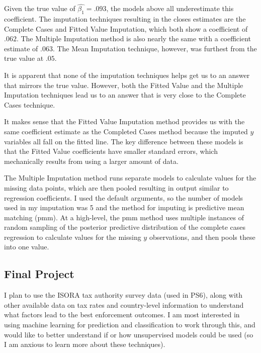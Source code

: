 \documentclass[nobib]{MSword}
\begin{document}
Given the true value of $\hat{\beta_1}=.093$, the models above all underestimate this coefficient. The imputation techniques resulting in the closes estimates are the Complete Cases and Fitted Value Imputation, which both show a coefficient of $.062$. The Multiple Imputation method is also nearly the same with a coefficient estimate of $.063$. The Mean Imputation technique, however, was furthest from the true value at $.05$. 

It is apparent that none of the imputation techniques helps get us to an answer that mirrors the true value. However, both the Fitted Value and the Multiple Imputation techniques lead us to an answer that is very close to the Complete Cases technique.

It makes sense that the Fitted Value Imputation method provides us with the same coefficient estimate as the Completed Cases method because the imputed $y$ variables all fall on the fitted line. The key difference between these models is that the Fitted Value coefficients have smaller standard errors, which mechanically results from using a larger amount of data.

The Multiple Imputation method runs separate models to calculate values for the missing data points, which are then pooled resulting in output similar to regression coefficients. I used the default arguments, so the number of models used in my imputation was 5 and the method for imputing is predictive mean matching (pmm). At a high-level, the pmm method uses multiple instances of random sampling of the posterior predictive distribution of the complete cases regression to calculate values for the missing $y$ observations, and then pools these into one value. 

\subsection*{Final Project}
I plan to use the ISORA tax authority survey data (used in PS6), along with other available data on tax rates and country-level information to understand what factors lead to the best enforcement outcomes. I am most interested in using machine learning for prediction and classification to work through this, and would like to better understand if or how unsupervised models could be used (so I am anxious to learn more about these techniques).
\end{document}
